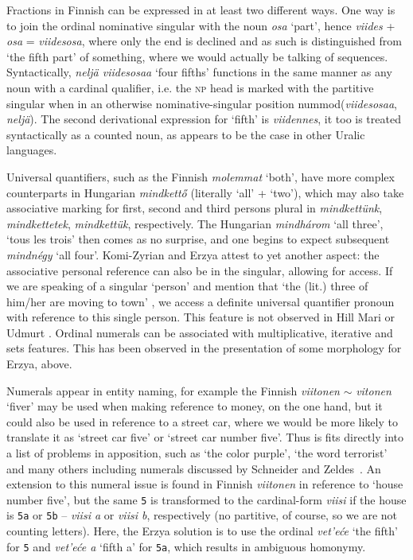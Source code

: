 \documentclass[free]{flammie}
\begin{document}
Fractions in Finnish can be expressed in at least two different ways. One way is
to join the ordinal nominative singular with the noun \textit{osa} `part', hence
\textit{viides} + \textit{osa} = \textit{viidesosa}, where only the end is
declined and as such is distinguished from `the fifth part' of something, where
we would actually be talking of sequences. Syntactically, \textit{neljä
viidesosaa} `four fifths' functions in the same manner as any noun with a
cardinal qualifier, i.e. the \textsc{np} head is marked with the partitive
singular when in an otherwise nominative-singular position
nummod(\textit{viidesosaa}, \textit{neljä}). The second derivational expression
for `fifth' is \textit{viidennes}, it too is treated syntactically as a counted
noun, as appears to be the case in other Uralic languages.

Universal quantifiers, such as the Finnish \textit{molemmat} `both', have more
complex counterparts in Hungarian \textit{mindkettő} (literally `all' + `two'),
which may also take associative marking for first, second and third persons
plural in \textit{mindkettünk}, \textit{mindkettetek}, \textit{mindkettük},
respectively. The Hungarian \textit{mindhárom} `all three', `tous les trois'
then comes as no surprise, and one begins to expect subsequent \textit{mindnégy}
`all four'. Komi-Zyrian and Erzya attest to yet another aspect: the associative
personal reference can also be in the singular, allowing for access. If we are
speaking of a singular `person' and mention that `the (lit.) three of him/her
are moving to town' \cite{rueter2013quantification}, we access a definite
universal quantifier pronoun with reference to this single person. This feature
is not observed in Hill Mari or Udmurt \cite[111--112]{kelmakov2008udmurtin}.
Ordinal numerals can be associated with multiplicative, iterative and sets
features. This has been observed in the presentation of some morphology for
Erzya, above.

Numerals appear in entity naming, for example the Finnish \textit{viitonen}
$\sim$ \textit{vitonen} `fiver' may be used when making reference to money, on
the one hand, but it could also be used in reference to a street car, where we
would be more likely to translate it as `street car five' or `street car number
five'. Thus is fits directly into a list of problems in apposition, such as `the
color purple', `the word terrorist' and many others including numerals discussed
by Schneider and Zeldes~\cite{schneider2021mischievous}. An extension to
this numeral issue is found in Finnish \textit{viitonen} in reference to `house
number five', but the same \texttt{5} is transformed to the cardinal-form
\textit{viisi} if the house is \texttt{5a} or \texttt{5b} -- \textit{viisi a} or
\textit{viisi b}, respectively (no partitive, of course, so we are not counting
letters). Here, the Erzya solution is to use the ordinal \textit{vet'eće} `the
fifth' for \texttt{5} and \textit{vet'eće a} `fifth a' for \texttt{5a}, which
results in ambiguous homonymy.
\end{document}
